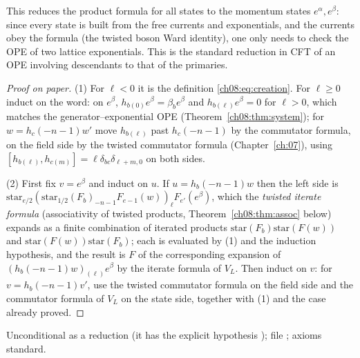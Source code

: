 \begin{physics}
This reduces the product formula for all states to the momentum states $e^\alpha,e^\beta$: since every state is built from the free currents and exponentials, and the currents obey the formula (the twisted boson Ward identity), one only needs to check the OPE of two lattice exponentials. This is the standard reduction in CFT of an OPE involving descendants to that of the primaries.
\end{physics}
\begin{proof}[Proof on paper]
(1) For $\ell<0$ it is the definition \eqref{ch08:eq:creation}.  For $\ell\ge0$ induct on the
word: on $e^\beta$, $h_{b(0)}e^\beta=\beta_be^\beta$ and $h_{b(\ell)}e^\beta=0$ for $\ell>0$, which
matches the generator--exponential OPE (Theorem~\ref{ch08:thm:system}); for $w=h_c(-n-1)w'$ move
$h_{b(\ell)}$ past $h_c(-n-1)$ by the commutator formula, on the field side by the twisted
commutator formula (Chapter~\ref{ch:07}), using $[h_{b(\ell)},h_{c(m)}]=\ell\delta_{bc}\delta_{\ell+m,0}$
on both sides.

(2) First fix $v=e^\beta$ and induct on $u$.  If $u=h_b(-n-1)w$ then the left side is
$\mathrm{star}_{e/2}(\mathrm{star}_{1/2}(F_b)_{-n-1}F_{e-1}(w))_\ell F_{e'}(e^\beta)$, which the
\emph{twisted iterate formula} (associativity of twisted products, Theorem~\ref{ch08:thm:assoc}
below) expands as a finite combination of iterated products $\mathrm{star}(F_b)\mathrm{star}(F(w))$
and $\mathrm{star}(F(w))\mathrm{star}(F_b)$; each is evaluated by (1) and the induction hypothesis,
and the result is $F$ of the corresponding expansion of $(h_b(-n-1)w)_{(\ell)}e^\beta$ by the
iterate formula of $V_L$.  Then induct on $v$: for $v=h_b(-n-1)v'$, use the twisted commutator
formula on the field side and the commutator formula of $V_L$ on the state side, together with
(1) and the case already proved.
\end{proof}
\begin{status}
Unconditional as a reduction (it has the explicit hypothesis ); file
; axioms standard.
\end{status}

